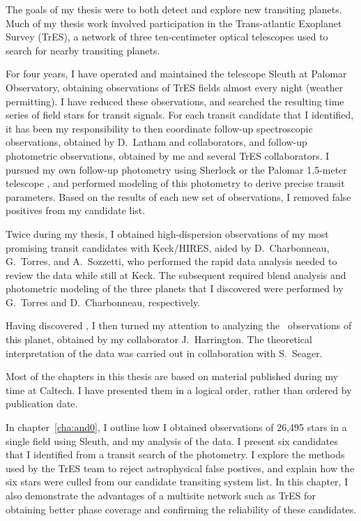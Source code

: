 The goals of my thesis were to both detect and explore new transiting planets.
Much of my thesis work involved participation in the Trans-atlantic Exoplanet Survey (TrES), a network of three ten-centimeter optical telescopes used to search for nearby transiting planets.

For four years, I have operated and maintained the telescope Sleuth at Palomar Observatory, obtaining observations of TrES fields almost every night (weather permitting).
I have reduced these observations, and searched the resulting time series of field stars for transit signals.
For each transit candidate that I identified, it has been my responsibility to then coordinate follow-up spectroscopic observations, obtained by D.~Latham and collaborators, and follow-up photometric observations, obtained by me and several TrES collaborators.
I pursued my own follow-up photometry using Sherlock \citep{Kotredes_Charbonneau_Looper:2004a} or the Palomar 1.5-meter telescope \citep[see, e.g.,][for an example of the 1.5-meter photometry]{Holman_Winn_Latham:apj:2006a}, and performed modeling of this photometry to derive precise transit parameters.
Based on the results of each new set of observations, I removed false positives from my candidate list.

Twice during my thesis, I obtained high-dispersion observations of my most promising transit candidates with Keck/HIRES, aided by D.~Charbonneau, G.~Torres, and A.~Sozzetti, who performed the rapid data analysis needed to review the data while still at Keck.
The subsequent required blend analysis and photometric modeling of the three planets that I discovered were performed by G.~Torres and D.~Charbonneau, respectively.

Having discovered \tresTwo, I then turned my attention to analyzing the \spi\ observations of this planet, obtained by my collaborator J.~Harrington.
The theoretical interpretation of the data was carried out in collaboration with S.~Seager.

Most of the chapters in this thesis are based on material published during my time at Caltech.
I have presented them in a logical order, rather than ordered by publication date.

In chapter~\ref{cha:and0}, I outline how I obtained observations of 26,495 stars in a single field using Sleuth, and my analysis of the data.
I present six candidates that I identified from a transit search of the photometry.
I explore the methods used by the TrES team to reject astrophysical false postives, and explain how the six stars were culled from our candidate transiting system list.
In this chapter, I also demonstrate the advantages of a multisite network such as TrES for obtaining better phase coverage and confirming the reliability of these candidates.


